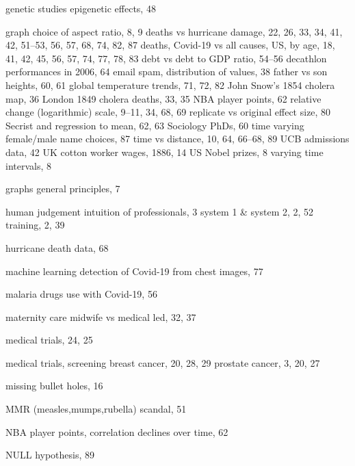 \documentclass[
  10ptls,
  b5paper]{book}
\begin{document}
\begin{theindex}
  \item genetic studies
    \subitem epigenetic effects, 48
  \item graph
    \subitem choice of aspect ratio, 8, 9
    \subitem deaths vs hurricane damage, 22, 26, 33, 34, 41, 42, 51--53, 
        56, 57, 68, 74, 82, 87
    \subitem deaths, Covid-19 vs all causes, US, by age, 18, 41, 42, 45, 
        56, 57, 74, 77, 78, 83
    \subitem debt vs debt to GDP ratio, 54--56
    \subitem decathlon performances in 2006, 64
    \subitem email spam, distribution of values, 38
    \subitem father vs son heights, 60, 61
    \subitem global temperature trends, 71, 72, 82
    \subitem John Snow's 1854 cholera map, 36
    \subitem London 1849 cholera deaths, 33, 35
    \subitem NBA player points, 62
    \subitem relative change (logarithmic) scale, 9--11, 34, 68, 69
    \subitem replicate vs original effect size, 80
    \subitem Secrist and regression to mean, 62, 63
    \subitem Sociology PhDs, 60
    \subitem time varying female/male name choices, 87
    \subitem time vs distance, 10, 64, 66--68, 89
    \subitem UCB admissions data, 42
    \subitem UK cotton worker wages, 1886, 14
    \subitem US Nobel prizes, 8
    \subitem varying time intervals, 8
  \item graphs
    \subitem general principles, 7

  \indexspace

  \item human judgement
    \subitem intuition of professionals, 3
    \subitem system 1 \& system 2, 2, 52
    \subitem training, 2, 39
  \item hurricane death data, 68

  \indexspace

  \item machine learning
    \subitem detection of Covid-19 from chest images, 77
  \item malaria drugs
    \subitem use with Covid-19, 56
  \item maternity care
    \subitem midwife vs medical led, 32, 37
  \item medical trials, 24, 25
  \item medical trials, screening
    \subitem breast cancer, 20, 28, 29
    \subitem prostate cancer, 3, 20, 27
  \item missing bullet holes, 16
  \item MMR (measles,mumps,rubella) scandal, 51

  \indexspace

  \item NBA player points, correlation declines over time, 62
  \item NULL hypothesis, 89


\end{theindex}
\end{document}
